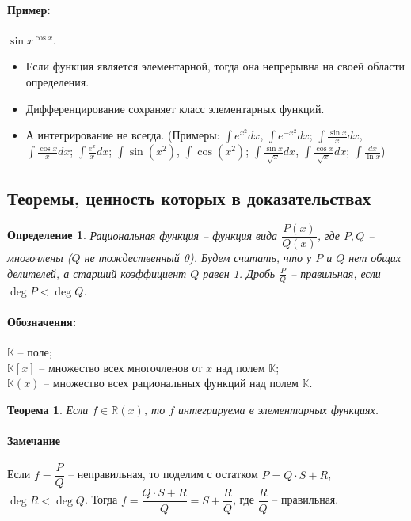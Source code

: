 \documentclass{article}
\theoremstyle{plain}
\newtheorem{theorem}{Теорема}
\newtheorem{definition}{Определение}
\theoremstyle{definition}
\theoremstyle{remark}
\renewcommand{\*}{\cdot}
\begin{document}
\paragraph{Пример:} $\sin x ^{\cos x}$.\\

\begin{itemize}
    \item Если функция является элементарной, тогда она непрерывна на своей области определения.
    \item Дифференцирование сохраняет класс элементарных функций.
    \item А интегрирование не всегда. (Примеры: $\int e^{x^2}dx$, $\int e^{-x^2}dx$; $\int \frac{\sin x}{x}dx$, $\int \frac{\cos x}{x}dx$; $\int \frac{e^x}{x}dx$; $\int \sin(x^2)$,  $\int \cos(x^2)$; $\int \frac{\sin x}{\sqrt{x}}dx$, $\int \frac{\cos x}{\sqrt{x}}dx$; $\int \frac{dx}{\ln x}$)
\end{itemize}

\subsection{Теоремы, ценность которых в доказательствах}
\begin{definition}
Рациональная функция -- функция вида $\dfrac{P(x)}{Q(x)}$, где $P, Q$ -- многочлены ($Q$ не тождественный 0).
Будем считать, что у $P$ и $Q$ нет общих делителей, а старший коэффициент $Q$ равен 1.
Дробь $\frac{P}{Q}$ -- правильная, если $\deg P < \deg Q$.
\end{definition}
\paragraph{Обозначения:} $\mathbb{K}$ -- поле;\\
$\mathbb{K}[x]$ -- множество всех многочленов от $x$ над полем $\mathbb{K}$;\\ 
$\mathbb{K}(x)$ -- множество всех рациональных функций  над полем $\mathbb{K}$.

\begin{theorem}\label{th:int_rat}
Если $f \in\mathbb{R}(x)$, то $f$ интегрируема в элементарных функциях.
\end{theorem}
\paragraph{Замечание} Если $f = \dfrac{P}{Q}$ -- неправильная, то поделим с остатком $P = Q\cdot S + R$, $\deg R < \deg Q$. Тогда $f = \dfrac{Q\cdot S + R}{Q} = S + \dfrac{R}{Q}$, где $\dfrac{R}{Q}$ -- правильная.\\
\end{document}
